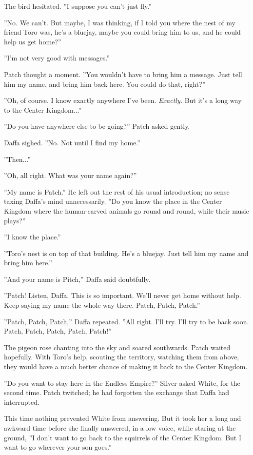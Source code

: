 \documentclass[12pt]{book}
\begin{document}
The bird hesitated. ''I suppose you can't just fly.''

''No. We can't. But maybe, I was thinking, if I told you where the nest of my friend Toro was, he's a bluejay, maybe you could bring him to us, and he could help us get home?''

''I'm not very good with messages.''

Patch thought a moment. ''You wouldn't have to bring him a message. Just tell him my name, and bring him back here. You could do that, right?''

''Oh, of course. I know exactly anywhere I've been. {\it Exactly.} But it's a long way to the Center Kingdom...''

''Do you have anywhere else to be going?'' Patch asked gently.

Daffa sighed. ''No. Not until I find my home.''

''Then...''

''Oh, all right. What was your name again?''

''My name is Patch.'' He left out the rest of his usual introduction; no sense taxing Daffa's mind unnecessarily. ''Do you know the place in the Center Kingdom where the human-carved animals go round and round, while their music plays?''

''I know the place.''

''Toro's nest is on top of that building. He's a bluejay. Just tell him my name and bring him here.''

''And your name is Pitch,'' Daffa said doubtfully.

''Patch! Listen, Daffa. This is so important. We'll never get home without help. Keep saying my name the whole way there. Patch, Patch, Patch.''

''Patch, Patch, Patch,'' Daffa repeated. ''All right. I'll try. I'll try to be back soon. Patch, Patch, Patch, Patch, Patch!''

The pigeon rose chanting into the sky and soared southwards. Patch waited hopefully. With Toro's help, scouting the territory, watching them from above, they would have a much better chance of making it back to the Center Kingdom.

''Do you want to stay here in the Endless Empire?'' Silver asked White, for the second time. Patch twitched; he had forgotten the exchange that Daffa had interrupted.

This time nothing prevented White from answering. But it took her a long and awkward time before she finally answered, in a low voice, while staring at the ground, ''I don't want to go back to the squirrels of the Center Kingdom. But I want to go wherever your son goes.''
\end{document}
